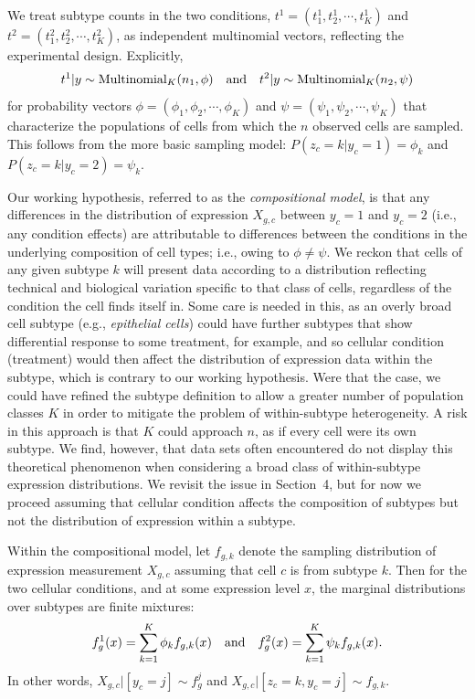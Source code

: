 \documentclass[aoas,preprint]{imsart}
\begin{document}
We treat subtype counts in the two conditions,  $t^1 = (t^1_1, t^1_2, \cdots, t^1_K )$ and 
$t^2 = (t^2_1, t^2_2, \cdots, t^2_K)$,  as independent multinomial
vectors, reflecting the experimental design.  Explicitly,
\begin{eqnarray}
\label{eq:mult}
t^1| y \sim \text{Multinomial}_K( n_1, \phi ) \quad {\mbox {\rm and}} \quad
t^2| y \sim \text{Multinomial}_K( n_2, \psi )
\end{eqnarray}
for probability vectors 
$\phi = (\phi_1, \phi_2, \cdots, \phi_K)$ and 
 $\psi = ( \psi_1, \psi_2, \cdots, \psi_K)$ that characterize the populations of
cells from which the $n$ observed cells are sampled.  This follows from the more basic 
sampling model:
$P(z_c=k|y_c=1) = \phi_k$ and $P(z_c=k| y_c =2 ) = \psi_k.$

Our working hypothesis, referred to as the {\em compositional model},  is that any differences in the distribution of expression $X_{g,c}$ 
between $y_c=1$ and $y_c=2$ (i.e., any condition effects) are attributable 
to differences between the conditions 
in the underlying composition of cell types; i.e.,
owing to $\phi \neq \psi$.  We reckon that cells of any given subtype $k$ will
present data according to a distribution reflecting technical 
and biological variation specific to that class of cells, regardless of the 
condition the cell finds itself in.   Some care is needed in this, as an overly
broad cell subtype (e.g., {\em epithelial cells}) could have
further subtypes that show differential response to some treatment, for example,
and so cellular condition (treatment) would then affect the distribution of 
expression data within the subtype, which is contrary to our working hypothesis.
Were that the case,  we could have refined the subtype definition to allow a greater
number of population classes $K$ in order to mitigate the problem of within-subtype 
heterogeneity. A  risk in this approach is that $K$ could approach $n$, as if  
every cell were  its own subtype.  We find, however,
that data sets often encountered do not display this theoretical phenomenon
when considering a broad class of within-subtype expression distributions.
We revisit the issue in Section~4, but for now we proceed assuming 
that cellular condition affects the composition of subtypes but not the distribution of expression
within a subtype.

Within the compositional model, let $f_{g,k}$ denote the sampling distribution
of expression measurement $X_{g,c}$ assuming that cell $c$ is from subtype $k$.
Then for the two cellular conditions, and at some expression level $x$, 
the marginal distributions over subtypes are finite mixtures:
\begin{eqnarray*}
f_g^1(x) = \sum_{k=1}^K \phi_k f_{g,k} (x) \quad {\mbox {\rm and}} \quad
f_g^2(x) = \sum_{k=1}^K \psi_k f_{g,k} (x).
\end{eqnarray*}
In other words,  $X_{g,c} |[ y_c=j]  \sim f_g^j$  and $X_{g,c} |[ z_c=k, y_c=j] \sim f_{g,k}$.
\end{document}
